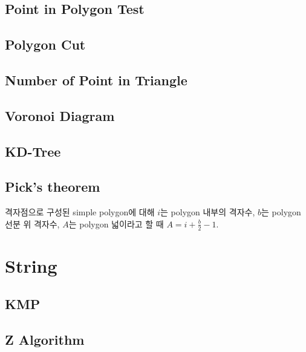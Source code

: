 \documentclass[9pt,landscape,a4paper,twocolumn]{extarticle}
\begin{document}
\subsection{Point in Polygon Test}


\subsection{Polygon Cut}


\subsection{Number of Point in Triangle}


\subsection{Voronoi Diagram}


\subsection{KD-Tree}


\subsection{Pick's theorem}

격자점으로 구성된 simple polygon에 대해 $i$는 polygon 내부의 격자수, $b$는 polygon 선분 위 격자수, $A$는 polygon 넓이라고 할 때 $A = i + \frac{b}{2} - 1$.

\section{String}

\subsection{KMP}


\subsection{Z Algorithm}

\end{document}
